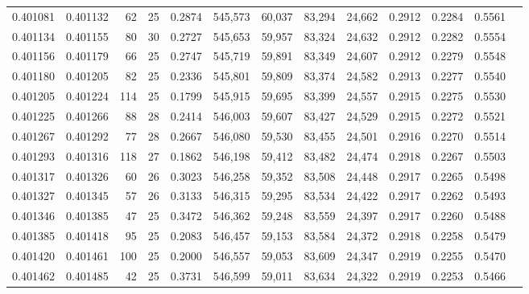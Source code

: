 \begin{tabular}{rrrrrrrrrrrrr}
0.401081 & 0.401132 &    62 &  25 &                                     0.2874 & 545,573 &  60,037 &  83,294 &  24,662 & 0.2912 & 0.2284 & 0.5561 \\
0.401134 & 0.401155 &    80 &  30 &                                     0.2727 & 545,653 &  59,957 &  83,324 &  24,632 & 0.2912 & 0.2282 & 0.5554 \\
0.401156 & 0.401179 &    66 &  25 &                                     0.2747 & 545,719 &  59,891 &  83,349 &  24,607 & 0.2912 & 0.2279 & 0.5548 \\
0.401180 & 0.401205 &    82 &  25 &                                     0.2336 & 545,801 &  59,809 &  83,374 &  24,582 & 0.2913 & 0.2277 & 0.5540 \\
0.401205 & 0.401224 &   114 &  25 &                                     0.1799 & 545,915 &  59,695 &  83,399 &  24,557 & 0.2915 & 0.2275 & 0.5530 \\
0.401225 & 0.401266 &    88 &  28 &                                     0.2414 & 546,003 &  59,607 &  83,427 &  24,529 & 0.2915 & 0.2272 & 0.5521 \\
0.401267 & 0.401292 &    77 &  28 &                                     0.2667 & 546,080 &  59,530 &  83,455 &  24,501 & 0.2916 & 0.2270 & 0.5514 \\
0.401293 & 0.401316 &   118 &  27 &                                     0.1862 & 546,198 &  59,412 &  83,482 &  24,474 & 0.2918 & 0.2267 & 0.5503 \\
0.401317 & 0.401326 &    60 &  26 &                                     0.3023 & 546,258 &  59,352 &  83,508 &  24,448 & 0.2917 & 0.2265 & 0.5498 \\
0.401327 & 0.401345 &    57 &  26 &                                     0.3133 & 546,315 &  59,295 &  83,534 &  24,422 & 0.2917 & 0.2262 & 0.5493 \\
0.401346 & 0.401385 &    47 &  25 &                                     0.3472 & 546,362 &  59,248 &  83,559 &  24,397 & 0.2917 & 0.2260 & 0.5488 \\
0.401385 & 0.401418 &    95 &  25 &                                     0.2083 & 546,457 &  59,153 &  83,584 &  24,372 & 0.2918 & 0.2258 & 0.5479 \\
0.401420 & 0.401461 &   100 &  25 &                                     0.2000 & 546,557 &  59,053 &  83,609 &  24,347 & 0.2919 & 0.2255 & 0.5470 \\
0.401462 & 0.401485 &    42 &  25 &                                     0.3731 & 546,599 &  59,011 &  83,634 &  24,322 & 0.2919 & 0.2253 & 0.5466 \\

\end{tabular}
